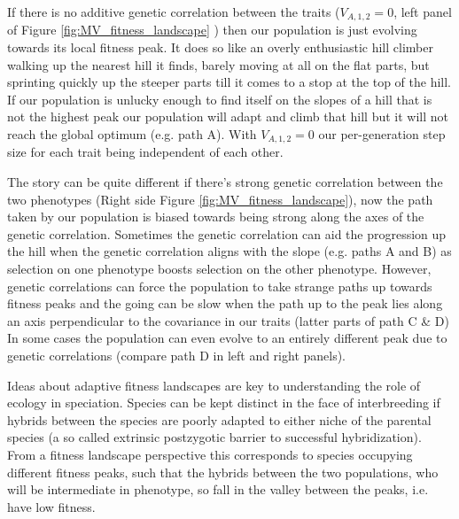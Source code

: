 If there is no additive genetic correlation between the traits ($
V_{A,1,2}=0$, left panel of Figure \ref{fig:MV_fitness_landscape} )
then our population is just evolving towards its local fitness peak.
It does so like an overly enthusiastic hill climber walking up the
nearest hill it finds, barely moving at all on the flat parts, but
sprinting quickly up the steeper parts till it comes to a stop at the
top of the hill. If our population is unlucky enough to find itself on
the slopes of a hill that is not the highest peak our population will
adapt and climb that hill but it will not reach the global optimum
(e.g. path A). With $V_{A,1,2}=0$  our per-generation step size for each trait being independent of
each other. 

The story can be quite different if there's strong genetic correlation
between the two phenotypes (Right side Figure
\ref{fig:MV_fitness_landscape}), now the path taken by our population
is biased towards being strong along the axes of the genetic
correlation. Sometimes the genetic correlation can aid the progression
up the hill when the genetic correlation aligns with the slope
(e.g. paths A and B) as
selection on one phenotype boosts selection on the other
phenotype. However, genetic correlations can force the population to
take strange paths up towards fitness peaks and the going can be slow
when the path up to the peak lies along an axis perpendicular to the
covariance in our traits (latter parts of path C \& D)
In some cases the population can even evolve to an entirely different
peak due to genetic correlations (compare path D in left and
right panels). 




Ideas about adaptive fitness landscapes are key to understanding the role of ecology in speciation. Species can be kept distinct in the face of interbreeding if hybrids between the species are poorly adapted to either niche of the parental species (a so called extrinsic postzygotic barrier to successful hybridization). From a fitness landscape perspective this corresponds to species occupying different fitness peaks, such that the hybrids between the two populations, who will be intermediate in phenotype, so fall in the valley between the peaks, i.e. have low fitness. 




